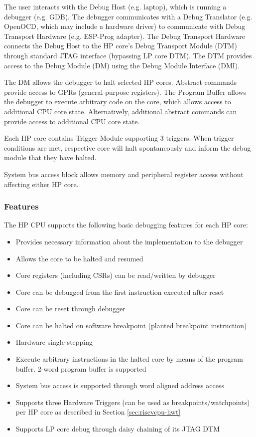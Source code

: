 \documentclass[main\_\_EN.tex]{subfiles}
\begin{document}
The user interacts with the Debug Host (e.g. laptop), which is running a debugger (e.g. GDB). The debugger communicates with a Debug Translator (e.g. OpenOCD, which may include a hardware driver) to communicate with Debug Transport Hardware (e.g. ESP-Prog adapter). The Debug Transport Hardware connects the Debug Host to the HP core's Debug Transport Module (DTM) through standard JTAG interface (bypassing LP core DTM). The DTM provides access to the Debug Module (DM) using the Debug Module Interface (DMI).

The DM allows the debugger to halt selected HP cores. Abstract commands provide access to GPRs (general-purpose registers). The Program Buffer allows the debugger to execute arbitrary code on the core, which allows access to additional CPU core state. Alternatively, additional abstract commands can provide access to additional CPU core state.

Each HP core contains Trigger Module supporting 3 triggers. When trigger conditions are met, respective core will halt spontaneously and inform the debug module that they have halted.

System bus access block allows memory and peripheral register access without affecting either HP core.


\subsubsection{Features}
\label{sec:riscvcpu-dbg-features}

The HP CPU supports the following basic debugging features for each HP core:

\begin{itemize}
    \item Provides necessary information about the implementation to the debugger
    \item Allows the core to be halted and resumed
    \item Core registers (including CSRs) can be read/written by debugger
    \item Core can be debugged from the first instruction executed after reset
    \item Core can be reset through debugger
    \item Core can be halted on software breakpoint (planted breakpoint instruction)
    \item Hardware single-stepping
    \item Execute arbitrary instructions in the halted core by means of the program buffer. 2-word program buffer is supported
    \item System bus access is supported through word aligned address access
    \item Supports three Hardware Triggers (can be used as breakpoints/watchpoints) per HP core as described in Section \ref{sec:riscvcpu-hwt}
    \item Supports LP core debug through daisy chaining of its JTAG DTM
\end{itemize}
\end{document}
